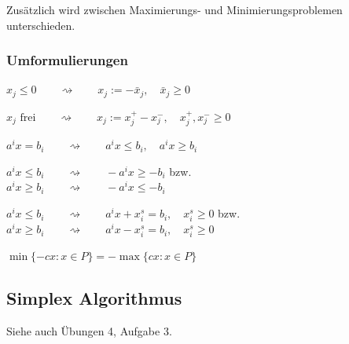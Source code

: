     Zusätzlich wird zwischen Maximierungs- und Minimierungsproblemen unterschieden.
    
  \subsubsection{Umformulierungen }
    \begin{aufzaehlung}
      \item $x_j \leq 0 \qquad \rightsquigarrow \qquad x_j := -\bar{x}_j, \quad \bar{x}_j \geq 0$
      \item $x_j \text{ frei} \qquad \rightsquigarrow \qquad x_j := x_j^+ - x_j^-, \quad x_j^+, x_j^- \geq 0$
      \item $a^i x = b_i \qquad \rightsquigarrow \qquad a^i x \leq b_i, \quad a^i x \geq b_i$
      \item $a^i x \leq b_i \qquad \rightsquigarrow \qquad -a^i x \geq -b_i$ bzw.\\
            $a^i x \geq b_i \qquad \rightsquigarrow \qquad -a^i x \leq -b_i$
      \item $a^i x \leq b_i \qquad \rightsquigarrow \qquad a^i x + x_i^s = b_i, \quad x_i^s \geq 0$ bzw.\\
            $a^i x \geq b_i \qquad \rightsquigarrow \qquad a^i x - x_i^s = b_i, \quad x_i^s \geq 0$ \\
      \item $\min \{-cx: x \in P\} = - \max \{cx: x \in P\}$ 
    \end{aufzaehlung}
  

\subsection{Simplex Algorithmus }
  Siehe auch Übungen 4, Aufgabe 3.
  

